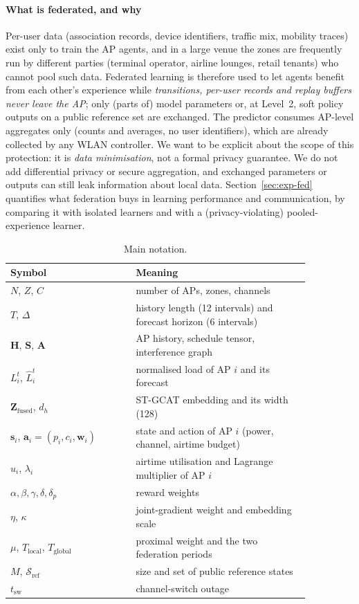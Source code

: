 \paragraph{What is federated, and why}
Per-user data (association records, device identifiers, traffic mix, mobility traces) exist only to train the AP agents, and in a large venue the zones are frequently run by different parties (terminal operator, airline lounges, retail tenants) who cannot pool such data. Federated learning is therefore used to let agents benefit from each other's experience while \emph{transitions, per-user records and replay buffers never leave the AP}; only (parts of) model parameters or, at Level~2, soft policy outputs on a public reference set are exchanged. The predictor consumes AP-level aggregates only (counts and averages, no user identifiers), which are already collected by any WLAN controller. We want to be explicit about the scope of this protection: it is \emph{data minimisation}, not a formal privacy guarantee. We do not add differential privacy or secure aggregation, and exchanged parameters or outputs can still leak information about local data. Section~\ref{sec:exp-fed} quantifies what federation buys in learning performance and communication, by comparing it with isolated learners and with a (privacy-violating) pooled-experience learner.


\begin{table}[htbp]
\centering
\caption{Main notation.}
\label{tab:notation}
\small
\begin{tabular}{P{0.36\linewidth}P{0.5\linewidth}}
\toprule
\textbf{Symbol} & \textbf{Meaning} \\
\midrule
$N$, $Z$, $C$ & number of APs, zones, channels \\
$T$, $\Delta$ & history length (12 intervals) and forecast horizon (6 intervals) \\
$\mathbf{H}$, $\mathbf{S}$, $\mathbf{A}$ & AP history, schedule tensor, interference graph \\
$L_i^t$, $\hat L_i^t$ & normalised load of AP $i$ and its forecast \\
$\mathbf{Z}_{\mathrm{fused}}$, $d_h$ & ST-GCAT embedding and its width (128) \\
$\mathbf{s}_i$, $\mathbf{a}_i=(p_i,c_i,\mathbf{w}_i)$ & state and action of AP $i$ (power, channel, airtime budget) \\
$u_i$, $\lambda_i$ & airtime utilisation and Lagrange multiplier of AP $i$ \\
$\alpha,\beta,\gamma,\delta,\delta_p$ & reward weights \\
$\eta$, $\kappa$ & joint-gradient weight and embedding scale \\
$\mu$, $T_{\mathrm{local}}$, $T_{\mathrm{global}}$ & proximal weight and the two federation periods \\
$M$, $\mathcal{S}_{\mathrm{ref}}$ & size and set of public reference states \\
$t_{\mathrm{sw}}$ & channel-switch outage \\
\bottomrule
\end{tabular}
\end{table}

